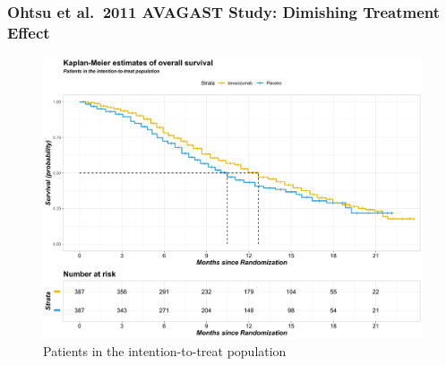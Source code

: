 \documentclass[12pt,twoside]{reedthesis}
\begin{document}
\hypertarget{ohtsu-et-al.-2011-avagast-study-dimishing-treatment-effect}{%
\subsubsection{Ohtsu et al.~2011 AVAGAST Study: Dimishing Treatment Effect}\label{ohtsu-et-al.-2011-avagast-study-dimishing-treatment-effect}}
\begin{figure}

{\centering \includegraphics[scale=0.55]{figure/ohtsu} 

}

\caption{Patients in the intention-to-treat population}\label{fig:unnamed-chunk-9}
\end{figure}
\clearpage
\end{document}
